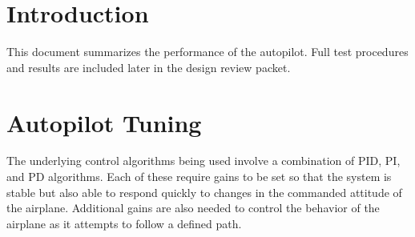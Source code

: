 \documentclass[]{auvsi_doc}
\begin{document}
\begin{AUVSITitlePage}
\begin{artifacttable}
\end{artifacttable}
\end{AUVSITitlePage}


\section{Introduction}
This document summarizes the performance of the autopilot. Full test procedures and results are included later in the design review packet.

\section{Autopilot Tuning}

The underlying control algorithms being used involve a combination of PID, PI, and PD algorithms. Each of these require gains to be set so that the system is stable but also able to respond quickly to changes in the commanded attitude of the airplane. Additional gains are also needed to control the behavior of the airplane as it attempts to follow a defined path.
\end{document}
